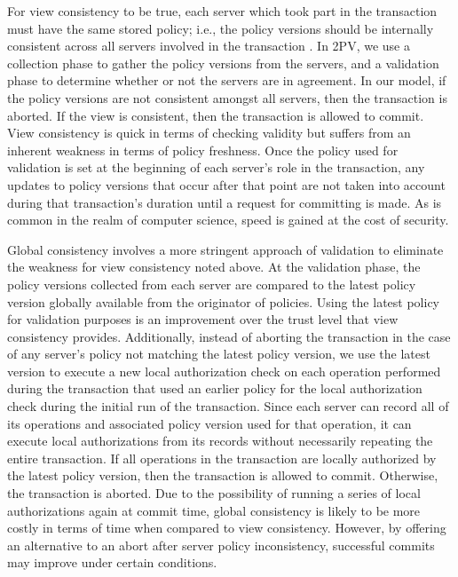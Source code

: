 \documentclass[11pt]{article}
\begin{document}
For view consistency to be true, each server which took part in the transaction must have the same stored policy; i.e., the policy versions should be internally consistent across all servers involved in the transaction \cite{Iskander}. In 2PV, we use a collection phase to gather the policy versions from the servers, and a validation phase to determine whether or not the servers are in agreement. In our model, if the policy versions are not consistent amongst all servers, then the transaction is aborted. If the view is consistent, then the transaction is allowed to commit. View consistency is quick in terms of checking validity but suffers from an inherent weakness in terms of policy freshness. Once the policy used for validation is set at the beginning of each server's role in the transaction, any updates to policy versions that occur after that point are not taken into account during that transaction's duration until a request for committing is made. As is common in the realm of computer science, speed is gained at the cost of security.

Global consistency involves a more stringent approach of validation to eliminate the weakness for view consistency noted above. At the validation phase, the policy versions collected from each server are compared to the latest policy version globally available from the originator of policies. Using the latest policy for validation purposes is an improvement over the trust level that view consistency provides. Additionally, instead of aborting the transaction in the case of any server's policy not matching the latest policy version, we use the latest version to execute a new local authorization check on each operation performed during the transaction that used an earlier policy for the local authorization check during the initial run of the transaction. Since each server can record all of its operations and associated policy version used for that operation, it can execute local authorizations from its records without necessarily repeating the entire transaction. If all operations in the transaction are locally authorized by the latest policy version, then the transaction is allowed to commit. Otherwise, the transaction is aborted. Due to the possibility of running a series of local authorizations again at commit time, global consistency is likely to be more costly in terms of time when compared to view consistency. However, by offering an alternative to an abort after server policy inconsistency, successful commits may improve under certain conditions.
\end{document}
